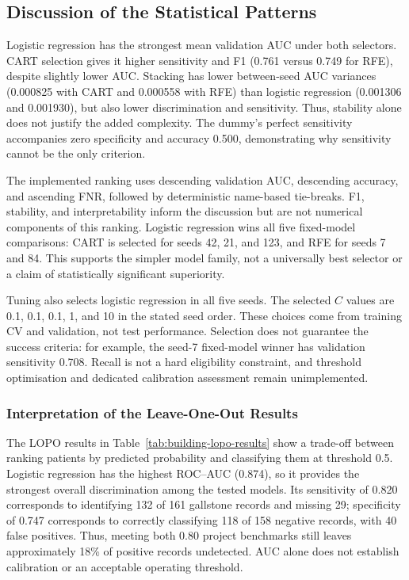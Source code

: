 \subsection{Discussion of the Statistical Patterns}
\label{subsec:pattern-discussion}
Logistic regression has the strongest mean validation AUC under both
selectors. CART selection gives it higher sensitivity and F1 (0.761 versus
0.749 for RFE), despite slightly lower AUC. Stacking has lower between-seed
AUC variances (0.000825 with CART and 0.000558 with RFE) than logistic
regression (0.001306 and 0.001930), but also lower discrimination and sensitivity.
Thus, stability alone does not justify the added complexity. The dummy's
perfect sensitivity accompanies zero specificity and accuracy 0.500,
demonstrating why sensitivity cannot be the only criterion.

The implemented ranking uses descending validation AUC, descending accuracy,
and ascending FNR, followed by deterministic name-based tie-breaks. F1,
stability, and interpretability inform the discussion but are not numerical
components of this ranking. Logistic regression wins all five fixed-model
comparisons: CART is selected for seeds 42, 21, and 123, and RFE for seeds
7 and 84. This supports the simpler model family, not a universally best
selector or a claim of statistically significant superiority.

Tuning also selects logistic regression in all five seeds. The selected
$C$ values are 0.1, 0.1, 0.1, 1, and 10 in the stated seed order.
These choices come from training CV and validation, not test performance.
Selection does not guarantee the success criteria: for example, the seed-7
fixed-model winner has validation sensitivity 0.708. Recall is not a hard
eligibility constraint, and threshold optimisation and dedicated calibration
assessment remain unimplemented.

\subsubsection{Interpretation of the Leave-One-Out Results}
\label{subsec:lopo-interpretation}
The LOPO results in Table~\ref{tab:building-lopo-results} show a trade-off
between ranking patients by predicted probability and classifying them at
threshold 0.5. Logistic regression has the highest ROC--AUC (0.874), so it
provides the strongest overall discrimination among the tested models.
Its sensitivity of 0.820 corresponds to identifying 132 of 161 gallstone
records and missing 29; specificity of 0.747 corresponds to correctly
classifying 118 of 158 negative records, with 40 false positives. Thus,
meeting both 0.80 project benchmarks still leaves approximately 18\% of
positive records undetected. AUC alone does not establish calibration or
an acceptable operating threshold.

